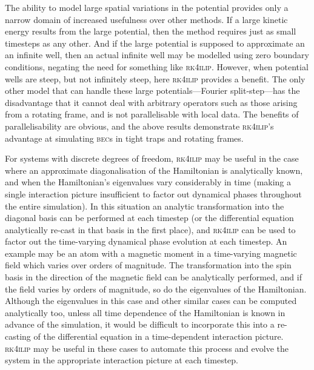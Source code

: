 The ability to model large spatial variations in the potential provides only a narrow domain of increased usefulness over other methods. If a large kinetic energy results from the large potential, then the method requires just as small timesteps as any other. And if the large potential is supposed to approximate an an infinite well, then an actual infinite well may be modelled using zero boundary conditions, negating the need for something like \textsc{rk4ilip}. However, when potential wells are steep, but not infinitely steep, here \textsc{rk4ilip} provides a benefit. The only other model that can handle these large potentials---Fourier split-step---has the disadvantage that it cannot deal with arbitrary operators such as those arising from a rotating frame, and is not parallelisable with local data. The benefits of parallelisability are obvious, and the above results demonstrate \textsc{rk4ilip}'s advantage at simulating \textsc{bec}s in tight traps and rotating frames.

For systems with discrete degrees of freedom, \textsc{rk4ilip} may be useful in the case where an approximate diagonalisation of the Hamiltonian is analytically known, and when the Hamiltonian's eigenvalues vary considerably in time (making a single interaction picture insufficient to factor out dynamical phases throughout the entire simulation). In this situation an analytic transformation into the diagonal basis can be performed at each timestep (or the differential equation analytically re-cast in that basis in the first place), and \textsc{rk4ilip} can be used to factor out the time-varying dynamical phase evolution at each timestep. An example may be an atom with a magnetic moment in a time-varying magnetic field which varies over orders of magnitude. The transformation into the spin basis in the direction of the magnetic field can be analytically performed, and if the field varies by orders of magnitude, so do the eigenvalues of the Hamiltonian. Although the eigenvalues in this case and other similar cases can be computed analytically too, unless all time dependence of the Hamiltonian is known in advance of the simulation, it would be difficult to incorporate this into a re-casting of the differential equation in a time-dependent interaction picture. \textsc{rk4ilip} may be useful in these cases to automate this process and evolve the system in the appropriate interaction picture at each timestep.
